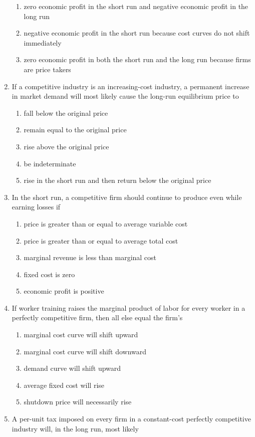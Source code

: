 \documentclass[10pt]{article}
\newenvironment{choiceslist}
  {\begin{enumerate}[label=(\Alph*), leftmargin=1.6em, itemsep=0.12em, topsep=0.18em, parsep=0pt]}
  {\end{enumerate}}
\begin{document}
\begin{multicols*}{2}
\begin{enumerate}[resume*=apq, leftmargin=*, itemsep=0.85em, topsep=0.2em, parsep=0pt]
\begin{choiceslist}
\item zero economic profit in the short run and negative economic profit in the long run
\item negative economic profit in the short run because cost curves do not shift immediately
\item zero economic profit in both the short run and the long run because firms are price takers
\end{choiceslist}
\item If a competitive industry is an increasing-cost industry, a permanent increase in market demand will most likely cause the long-run equilibrium price to
\begin{choiceslist}
\item fall below the original price
\item remain equal to the original price
\item rise above the original price
\item be indeterminate
\item rise in the short run and then return below the original price
\end{choiceslist}
\item In the short run, a competitive firm should continue to produce even while earning losses if
\begin{choiceslist}
\item price is greater than or equal to average variable cost
\item price is greater than or equal to average total cost
\item marginal revenue is less than marginal cost
\item fixed cost is zero
\item economic profit is positive
\end{choiceslist}
\item If worker training raises the marginal product of labor for every worker in a perfectly competitive firm, then all else equal the firm's
\begin{choiceslist}
\item marginal cost curve will shift upward
\item marginal cost curve will shift downward
\item demand curve will shift upward
\item average fixed cost will rise
\item shutdown price will necessarily rise
\end{choiceslist}
\item A per-unit tax imposed on every firm in a constant-cost perfectly competitive industry will, in the long run, most likely

\end{enumerate}
\end{multicols*}
\end{document}
